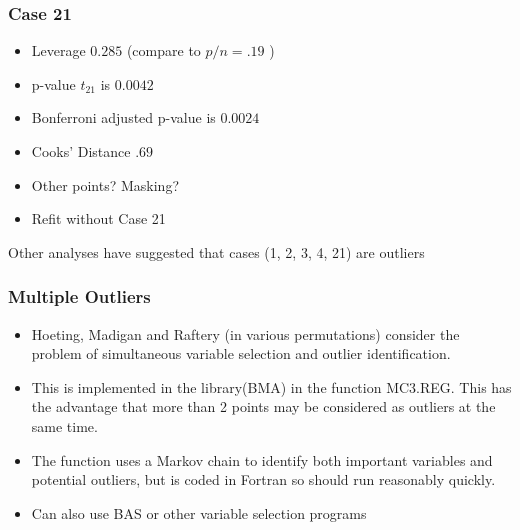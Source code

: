 \documentclass[]{beamer}
\begin{document}
  \begin{frame}
    \frametitle{Case 21}
    \begin{itemize}
    \item Leverage $0.285$  (compare to $p/n = .19$ ) \pause
\item p-value $t_{21}$ is $0.0042$ \pause
\item Bonferroni adjusted p-value is $0.0024$ \pause
\item Cooks' Distance $.69$   \pause
\item Other points?  Masking?  \pause
\item Refit without Case 21 \pause
    \end{itemize}
Other analyses have suggested that cases (1, 2, 3, 4, 21) are outliers
  \end{frame}

  \begin{frame} \frametitle{Multiple Outliers}
    \begin{itemize}
    \item Hoeting, Madigan and Raftery (in various permutations)
      consider the problem of simultaneous variable selection and
      outlier identification. \pause
\item   This is implemented in the library(BMA) in the function
  MC3.REG. 
This has the advantage that more than 2 points may be considered as
outliers at the same time. \pause
\item The function uses a Markov chain to identify both important
  variables and potential outliers, but is coded in Fortran so should
  run reasonably quickly. \pause
\item Can also use BAS or other variable selection programs \pause
  \end{itemize}
  \end{frame}
\end{document}
